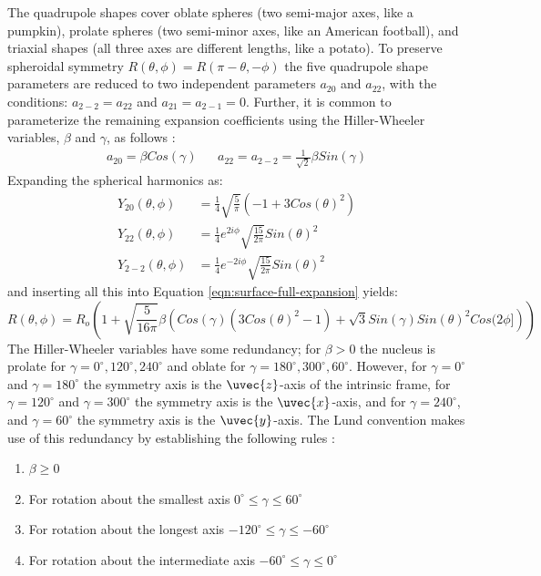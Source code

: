 The quadrupole shapes cover oblate spheres (two semi-major axes, like a pumpkin), prolate spheres (two semi-minor axes, like an American football), and triaxial shapes (all three axes are different lengths, like a potato). To preserve spheroidal symmetry $R(\theta,\phi) = R(\pi - \theta,-\phi)$ the five quadrupole shape parameters are reduced to two independent parameters $a_{2 0}$ and $a_{2 2}$, with the conditions: $a_{2 -2}=a_{2 2}$ and $a_{2 1}=a_{2 -1}=0$. Further, it is common to parameterize the remaining expansion coefficients using the Hiller-Wheeler variables, $\beta$ and $\gamma$, as follows \cite{wongBook}:
\begin{align}
\label{eqn:chp2-hiller-wheeler}
a_{2 0} = \beta Cos(\gamma)  & &  a_{2 2} = a_{2 -2} = \frac{1}{\sqrt{2}}\beta Sin(\gamma)
\end{align}
Expanding the spherical harmonics as:
\begin{align}
\label{eqn:spherical-harmonics}
Y_{2 0}(\theta, \phi) &= \frac{1}{4} \sqrt{\frac{5}{\pi }} \left(-1+3 Cos(\theta )^2\right)\\
Y_{2 2}(\theta, \phi) &= \frac{1}{4} e^{2 i \phi } \sqrt{\frac{15}{2 \pi }} Sin(\theta)^2\\
Y_{2 -2}(\theta, \phi) &= \frac{1}{4} e^{-2 i \phi } \sqrt{\frac{15}{2 \pi }} Sin(\theta)^2
\end{align} 
and inserting all this into Equation \ref{eqn:surface-full-expansion} yields:
\begin{equation}
\label{eqn:quadrupole-surface}
R(\theta, \phi) = R_{o}\left(1+\sqrt{\frac{5}{16 \pi }}\beta  \left(Cos(\gamma ) \left(3 Cos(\theta )^2-1\right)+\sqrt{3} Sin(\gamma ) Sin(\theta )^2Cos(2 \phi ]\right)\right)
\end{equation} 
The Hiller-Wheeler variables have some redundancy; for $\beta>0$ the nucleus is prolate for $\gamma=0^{\circ},120^{\circ},240^{\circ}$ and oblate for $\gamma=180^{\circ},300^{\circ},60^{\circ}$. However, for $\gamma=0^{\circ}$ and $\gamma=180^{\circ}$ the symmetry axis is the $\uvec{z}$-axis of the intrinsic frame, for $\gamma=120^{\circ}$ and $\gamma=300^{\circ}$ the symmetry axis is the $\uvec{x}$-axis, and for $\gamma=240^{\circ}$, and $\gamma=60^{\circ}$ the symmetry axis is the $\uvec{y}$-axis. The Lund convention makes use of this redundancy by establishing the following rules \cite{wongBook}:
\begin{enumerate}
\item $\beta\geq0$
\item For rotation about the smallest axis $0^{\circ}\leq\gamma\leq60^{\circ}$
\item For rotation about the longest axis $-120^{\circ}\leq\gamma\leq-60^{\circ}$
\item For rotation about the intermediate axis $-60^{\circ}\leq\gamma\leq0^{\circ}$
\end{enumerate}
